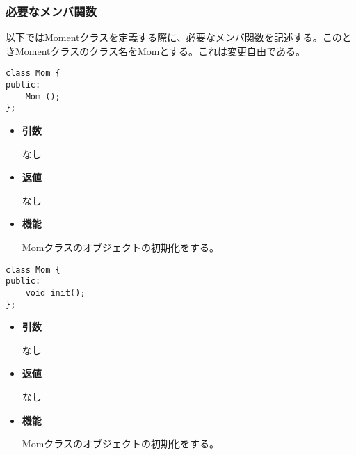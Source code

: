 \subsubsection{必要なメンバ関数}


以下ではMomentクラスを定義する際に、必要なメンバ関数を記述する。このと
きMomentクラスのクラス名をMomとする。これは変更自由である。



\begin{screen}
\begin{verbatim}
class Mom {
public:
    Mom ();
};
\end{verbatim}
\end{screen}

\begin{itemize}

\item {\bf 引数}

  なし
  
\item {\bf 返値}

  なし

\item {\bf 機能}

  Momクラスのオブジェクトの初期化をする。
  
\end{itemize}



\begin{screen}
\begin{verbatim}
class Mom {
public:
    void init();
};
\end{verbatim}
\end{screen}

\begin{itemize}

\item {\bf 引数}

  なし
  
\item {\bf 返値}

  なし

\item {\bf 機能}

  Momクラスのオブジェクトの初期化をする。
  
\end{itemize}

